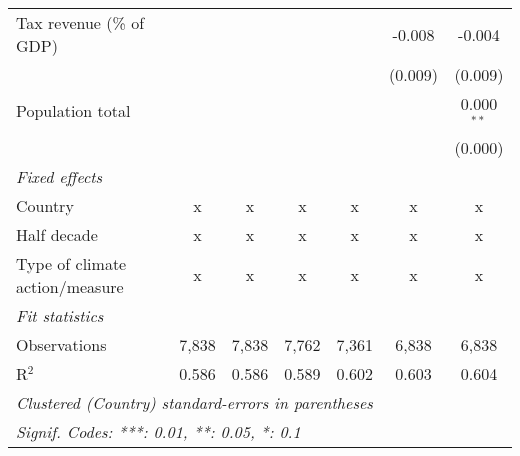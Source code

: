 \begin{tabular}{lcccccc}
   Tax revenue (\% of GDP)              &              &               &                &                & -0.008         & -0.004\\   
                                        &              &               &                &                & (0.009)        & (0.009)\\   
   Population total                     &              &               &                &                &                & 0.000$^{**}$\\   
                                        &              &               &                &                &                & (0.000)\\   
   \emph{Fixed effects}\\
   Country                              & x            & x             & x              & x              & x              & x\\  
   Half decade                          & x            & x             & x              & x              & x              & x\\  
   Type of climate action/measure       & x            & x             & x              & x              & x              & x\\  
   \midrule \emph{Fit statistics}\\
   Observations                         & 7,838        & 7,838         & 7,762          & 7,361          & 6,838          & 6,838\\  
   R$^2$                                & 0.586        & 0.586         & 0.589          & 0.602          & 0.603          & 0.604\\  
   \midrule
   \multicolumn{7}{l}{\emph{Clustered (Country) standard-errors in parentheses}}\\
   \multicolumn{7}{l}{\emph{Signif. Codes: ***: 0.01, **: 0.05, *: 0.1}}\\
\end{tabular}
\par\endgroup


